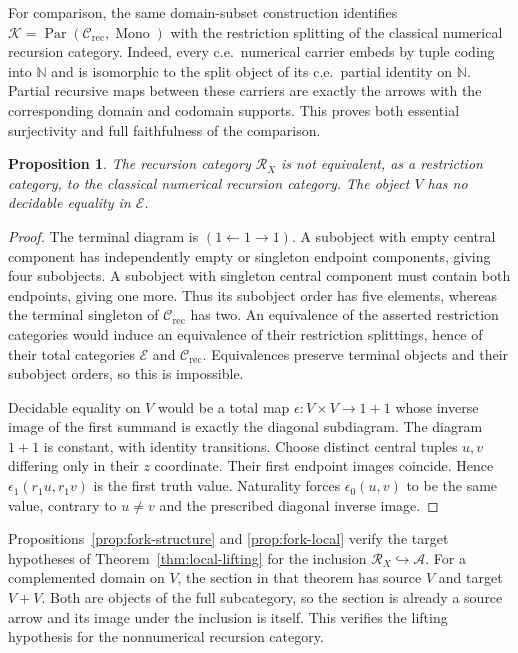 \documentclass[11pt]{article}
\newtheorem{proposition}[theorem]{Proposition}
\newcommand{\N}{\mathbb N}
\begin{document}
For comparison, the same domain-subset construction identifies
$\mathcal K=\operatorname{Par}(\mathcal C_{\mathrm{rec}},
\operatorname{Mono})$ with the restriction splitting of the
classical numerical recursion category. Indeed, every c.e.\
numerical carrier embeds by tuple coding into $\N$ and is
isomorphic to the split object of its c.e.\ partial identity
on $\N$. Partial recursive maps between these carriers are
exactly the arrows with the corresponding domain and codomain
supports. This proves both essential surjectivity and full
faithfulness of the comparison.

\begin{proposition}\label{prop:fork-distinction}
The recursion category $\mathscr R_X$ is not equivalent, as a
restriction category, to the classical numerical recursion category.
The object $V$ has no decidable equality in $\mathcal E$.
\end{proposition}
\begin{proof}
The terminal diagram is $(1\leftarrow1\to1)$. A subobject
with empty central component has independently empty or singleton
endpoint components, giving four subobjects. A subobject with
singleton central component must contain both endpoints, giving
one more. Thus its subobject order has five elements, whereas
the terminal singleton of $\mathcal C_{\mathrm{rec}}$ has two.
An equivalence of the asserted restriction categories would induce
an equivalence of their restriction splittings, hence of their
total categories $\mathcal E$ and $\mathcal C_{\mathrm{rec}}$.
Equivalences preserve terminal objects and their subobject orders,
so this is impossible.

Decidable equality on $V$ would be a total map
$\epsilon:V\times V\to1+1$ whose inverse image of the first
summand is exactly the diagonal subdiagram. The diagram $1+1$
is constant, with identity transitions. Choose distinct central
tuples $u,v$ differing only in their $z$ coordinate. Their first
endpoint images coincide. Hence $\epsilon_1(r_1u,r_1v)$ is the
first truth value. Naturality forces $\epsilon_0(u,v)$ to be
the same value, contrary to $u\ne v$ and the prescribed diagonal
inverse image.
\end{proof}

Propositions~\ref{prop:fork-structure} and \ref{prop:fork-local}
verify the target hypotheses of Theorem~\ref{thm:local-lifting}
for the inclusion $\mathscr R_X\hookrightarrow\mathcal A$.
For a complemented domain on $V$, the section in that theorem
has source $V$ and target $V+V$. Both are objects of the full
subcategory, so the section is already a source arrow and its
image under the inclusion is itself. This verifies the lifting
hypothesis for the nonnumerical recursion category.
\end{document}
